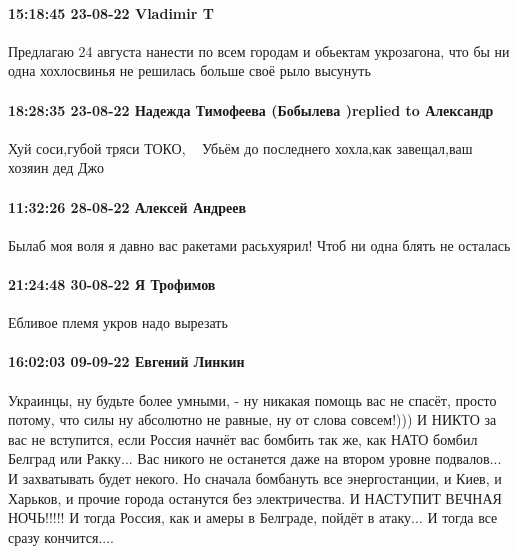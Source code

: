  
 
 
 
 

\paragraph{15:18:45 23-08-22 Vladimir T}

Предлагаю 24 августа нанести по всем городам и обьектам укрозагона, что бы ни
одна хохлосвинья не решилась больше своё рыло высунуть

\paragraph{18:28:35 23-08-22 Надежда Тимофеева (Бобылева )replied to Александр}

Хуй соси,губой тряси ТОКО,🤣🤣🤣 Убьём до последнего хохла,как завещал,ваш
хозяин дед Джо 🤪👊🏼💀💪🏻🇷🇺

\paragraph{11:32:26 28-08-22 Алексей Андреев}

Былаб моя воля я давно вас ракетами расьхуярил! Чтоб ни одна блять не осталась

\paragraph{21:24:48 30-08-22 Я Трофимов}

Ебливое племя укров надо вырезать

\paragraph{16:02:03 09-09-22 Евгений Линкин}

Украинцы, ну будьте более умными, - ну никакая помощь вас не спасёт, просто
потому, что силы ну абсолютно не равные, ну от слова совсем!))) И НИКТО за вас
не вступится, если Россия начнёт вас бомбить так же, как НАТО бомбил Белград
или Ракку... Вас никого не останется даже на втором уровне подвалов... И
захватывать будет некого. Но сначала бомбануть все энергостанции, и Киев, и
Харьков, и прочие города останутся без электричества. И НАСТУПИТ ВЕЧНАЯ
НОЧЬ!!!!! И тогда Россия, как и амеры в Белграде, пойдёт в атаку... И тогда все
сразу кончится....

